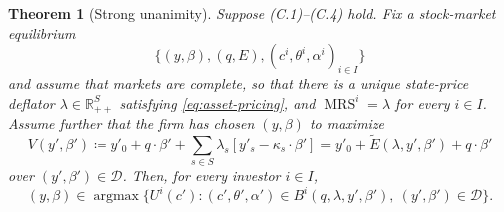 \documentclass[11pt,a4paper,oneside]{book}
\def\R{\mathbb{R}}
\DeclareMathOperator*{\argmax}{argmax}
\DeclareMathOperator{\MRS}{MRS}
\theoremstyle{plain}
\newtheorem{theorem}{Theorem}[chapter]
\theoremstyle{definition}
\theoremstyle{remark}
\numberwithin{equation}{chapter}
\begin{document}
\begin{theorem}[Strong unanimity]\label{thm:strong-unanimity}
Suppose \textup{(C.1)--(C.4)} hold.
Fix a stock-market equilibrium
\begin{equation*}
  \bigl\{ (y, \beta), (q, E), (c^i, \theta^i, \alpha^i)_{i \in I} \bigr\}
\end{equation*}
and assume that markets are complete, so that there is a unique state-price deflator $\lambda \in \R^S_{++}$ satisfying \eqref{eq:asset-pricing}, and $\MRS^i = \lambda$ for every $i \in I$.
Assume further that the firm has chosen $(y, \beta)$ to maximize
\begin{equation*}
  V(y', \beta') \coloneqq y'_0 + q \cdot \beta' + \sum_{s \in S} \lambda_s [y'_s - \kappa_s \cdot \beta']
  = y'_0 + \widetilde{E}(\lambda, y', \beta') + q \cdot \beta'
\end{equation*}
over $(y', \beta') \in \mathcal{D}$.
Then, for every investor $i \in I$,
\begin{equation}\label{eq:strong-unanimity}
  (y, \beta) \in \argmax \bigl\{ U^i(c') \colon (c', \theta', \alpha') \in B^i(q, \lambda, y', \beta'), \ (y', \beta') \in \mathcal{D} \bigr\}.
\end{equation}
\end{theorem}
\end{document}
